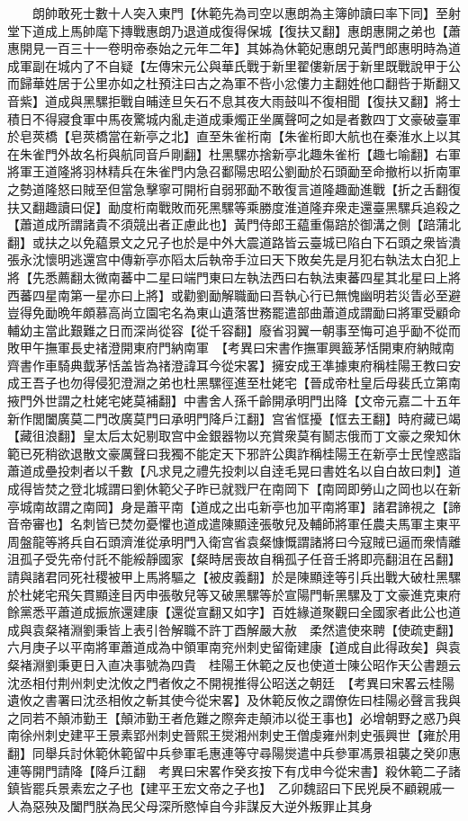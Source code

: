　　朗帥敢死士數十人突入東門【休範先為司空以惠朗為主簿帥讀曰率下同】至射堂下道成上馬帥麾下摶戰惠朗乃退道成復得保城【復扶又翻】惠朗惠開之弟也【蕭惠開見一百三十一卷明帝泰始之元年二年】其姊為休範妃惠朗兄黃門郎惠明時為道成軍副在城内了不自疑【左傳宋元公與華氏戰于新里翟僂新居于新里既戰說甲于公而歸華姓居于公里亦如之杜預注曰古之為軍不呰小忿僂力主翻姓他口翻呰于斯翻又音紫】道成與黑騾拒戰自晡逹旦矢石不息其夜大雨鼓叫不復相聞【復扶又翻】將士積日不得寢食軍中馬夜驚城内亂走道成秉燭正坐厲聲呵之如是者數四丁文豪破臺軍於皂莢橋【皂莢橋當在新亭之北】直至朱雀桁南【朱雀桁即大航也在秦淮水上以其在朱雀門外故名桁與航同音戶剛翻】杜黑騾亦捨新亭北趣朱雀桁【趣七喻翻】右軍將軍王道隆將羽林精兵在朱雀門内急召鄱陽忠昭公劉勔於石頭勔至命撤桁以折南軍之勢道隆怒曰賊至但當急擊寧可開桁自弱邪勔不敢復言道隆趣勔進戰【折之舌翻復扶又翻趣讀曰促】勔度桁南戰敗而死黑騾等乘勝度淮道隆弃衆走還臺黑騾兵追殺之【蕭道成所謂諸貴不須競出者正慮此也】黃門侍郎王藴重傷踣於御溝之側【踣蒲北翻】或扶之以免藴景文之兄子也於是中外大震道路皆云臺城已陷白下石頭之衆皆潰張永沈懷明逃還宫中傳新亭亦䧟太后執帝手泣曰天下敗矣先是月犯右執法太白犯上將【先悉薦翻太微南蕃中二星曰端門東曰左執法西曰右執法東蕃四星其北星曰上將西蕃四星南第一星亦曰上將】或勸劉勔解職勔曰吾執心行已無愧幽明若災眚必至避豈得免勔晩年頗慕高尚立園宅名為東山遺落世務罷遣部曲蕭道成謂勔曰將軍受顧命輔幼主當此艱難之日而深尚從容【從千容翻】廢省羽翼一朝事至悔可追乎勔不從而敗甲午撫軍長史禇澄開東府門納南軍　【考異曰宋書作撫軍興籖茅恬開東府納賊南齊書作車騎典韯茅恬盖皆為禇澄諱耳今從宋畧】擁安成王凖據東府稱桂陽王教曰安成王吾子也勿得侵犯澄淵之弟也杜黑騾徑進至杜姥宅【晉成帝杜皇后母裴氏立第南掖門外世謂之杜姥宅姥莫補翻】中書舍人孫千齡開承明門出降【文帝元嘉二十五年新作閭闔廣莫二門改廣莫門曰承明門降戶江翻】宫省恇擾【恇去王翻】時府藏已竭【藏徂浪翻】皇太后太妃剔取宫中金銀器物以充賞衆莫有鬭志俄而丁文豪之衆知休範已死稍欲退散文豪厲聲曰我獨不能定天下邪許公輿詐稱桂陽王在新亭士民惶惑詣蕭道成壘投刺者以千數【凡求見之禮先投刺以自逹毛晃曰書姓名以自白故曰刺】道成得皆焚之登北城謂曰劉休範父子昨已就戮尸在南岡下【南岡即勞山之岡也以在新亭城南故謂之南岡】身是蕭平南【道成之出屯新亭也加平南將軍】諸君諦視之【諦音帝審也】名刺皆已焚勿憂懼也道成遣陳顯逹張敬兒及輔師將軍任農夫馬軍主東平周盤龍等將兵自石頭濟淮從承明門入衛宫省袁粲慷慨謂諸將曰今寇賊已逼而衆情離沮孤子受先帝付託不能綏靜國家【粲時居喪故自稱孤子任音壬將即亮翻沮在呂翻】請與諸君同死社稷被甲上馬將驅之【被皮義翻】於是陳顯逹等引兵出戰大破杜黑騾於杜姥宅飛矢貫顯逹目丙申張敬兒等又破黑騾等於宣陽門斬黑騾及丁文豪進克東府餘黨悉平蕭道成振旅還建康【還從宣翻又如字】百姓緣道聚觀曰全國家者此公也道成與袁粲褚淵劉秉皆上表引咎解職不許丁酉解嚴大赦　柔然遣使來聘【使疏吏翻】　六月庚子以平南將軍蕭道成為中領軍南兖州刺史留衛建康【道成自此得政矣】與袁粲褚淵劉秉更日入直决事號為四貴　桂陽王休範之反也使道士陳公昭作天公書題云沈丞相付荆州刺史沈攸之門者攸之不開視推得公昭送之朝廷　【考異曰宋畧云桂陽遺攸之書署曰沈丞相攸之斬其使今從宋畧】及休範反攸之謂僚佐曰桂陽必聲言我與之同若不顛沛勤王【顛沛勤王者危難之際奔走顛沛以從王事也】必增朝野之惑乃與南徐州刺史建平王景素郢州刺史晉熙王爕湘州刺史王僧虔雍州刺史張興世【雍於用翻】同舉兵討休範休範留中兵參軍毛惠連等守尋陽爕遣中兵參軍馮景祖襲之癸卯惠連等開門請降【降戶江翻　考異曰宋畧作癸亥按下有戊申今從宋書】殺休範二子諸鎮皆罷兵景素宏之子也【建平王宏文帝之子也】　乙卯魏詔曰下民兇戾不顧親戚一人為惡殃及闔門朕為民父母深所愍悼自今非謀反大逆外叛罪止其身